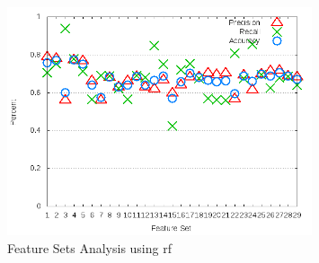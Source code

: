 \begin{figure}[!t]
    \centering
        \includegraphics[width=0.8\textwidth]{images/rf/test_6/acra_sample_range}
        \caption{Feature Sets Analysis using \gls{rf}}
        \label{fig:feature_set_acra_rf}
\end{figure}



